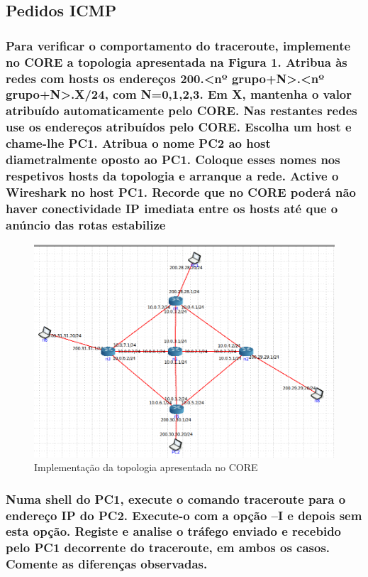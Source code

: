 \documentclass{article}
\begin{document}
\subsection{Pedidos ICMP}

\subsubsection{Para verificar o comportamento do traceroute, implemente no CORE a topologia apresentada na Figura 1. Atribua às redes com hosts os endereços 200.\textless nº grupo+N\textgreater .\textless nº grupo+N\textgreater .X/24, com N=0,1,2,3. Em X, mantenha o valor atribuído automaticamente pelo CORE. Nas restantes redes use os endereços atribuídos pelo CORE. Escolha um host e chame-lhe PC1. Atribua o nome PC2 ao host diametralmente oposto ao PC1. Coloque esses nomes nos respetivos hosts da topologia e arranque a rede. Active o Wireshark no host PC1. Recorde que no CORE poderá não haver conectividade IP imediata entre os hosts até que o anúncio das rotas estabilize}

\begin{figure}[h]
    \centering
    \includegraphics[width=1\textwidth]{images/rede.png}
    \caption{\label{fig:pacote}Implementação da topologia apresentada no CORE}
\end{figure}

\subsubsection{Numa shell do PC1, execute o comando traceroute para o endereço IP do PC2. Execute-o com a opção –I e depois sem esta opção. Registe e analise o tráfego enviado e recebido pelo PC1 decorrente do traceroute, em ambos os casos. Comente as diferenças observadas.}
\end{document}
